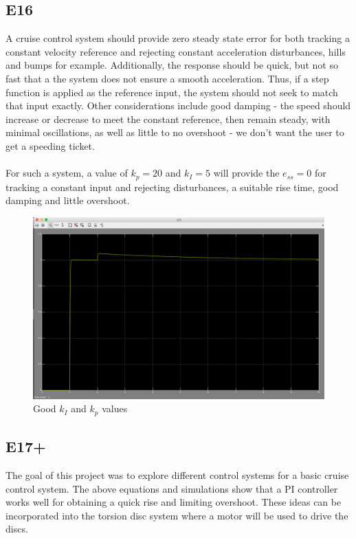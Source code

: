 \documentclass[10pt,titlepage]{article}
\begin{document}
	\subsection*{E16}
		A cruise control system should provide zero steady state error for both tracking a constant velocity reference and rejecting constant acceleration disturbances, hills and bumps for example. Additionally, the response should be quick, but not so fast that a the system does not ensure a smooth acceleration. Thus, if a step function is applied as the reference input, the system should not seek to match that input exactly. Other considerations include good damping - the speed should increase or decrease to meet the constant reference, then remain steady, with minimal oscillations, as well as little to no overshoot - we don't want the user to get a speeding ticket.\\\\
		For such a system, a value of $k_p=20$ and $k_I=5$ will provide the $e_{ss}=0$ for tracking a constant input and rejecting disturbances, a suitable rise time, good damping and little overshoot. 
		\begin{figure}[H]
		\centering
		\includegraphics[scale=0.3]{e16}
		\caption{Good $k_I$ and $k_p$ values}
	\end{figure}
		
	\subsection*{E17+}
		The goal of this project was to explore different control systems for a basic cruise control system. The above equations and simulations show that a PI controller works well for obtaining a quick rise and limiting overshoot. These ideas can be incorporated into the torsion disc system where a motor will be used to drive the discs. 
\end{document}
